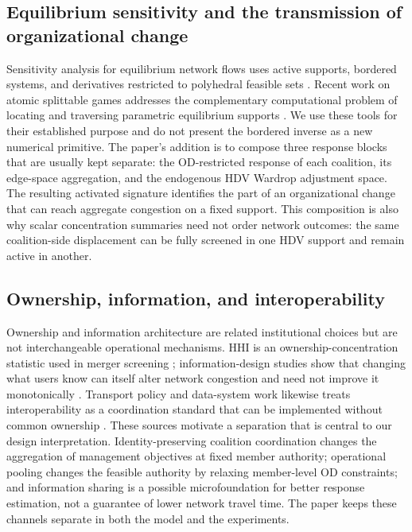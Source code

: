 \subsection{Equilibrium sensitivity and the transmission of organizational change}

Sensitivity analysis for equilibrium network flows uses active supports, bordered systems, and derivatives restricted to polyhedral feasible sets \citep{tobin1988,qiu1989,patriksson2004,josefsson2006}. Recent work on atomic splittable games addresses the complementary computational problem of locating and traversing parametric equilibrium supports \citep{klimm2025}. We use these tools for their established purpose and do not present the bordered inverse as a new numerical primitive. The paper's addition is to compose three response blocks that are usually kept separate: the OD-restricted response of each coalition, its edge-space aggregation, and the endogenous HDV Wardrop adjustment space. The resulting activated signature identifies the part of an organizational change that can reach aggregate congestion on a fixed support. This composition is also why scalar concentration summaries need not order network outcomes: the same coalition-side displacement can be fully screened in one HDV support and remain active in another.

\subsection{Ownership, information, and interoperability}

Ownership and information architecture are related institutional choices but are not interchangeable operational mechanisms. HHI is an ownership-concentration statistic used in merger screening \citep{usdojftc2023}; information-design studies show that changing what users know can itself alter network congestion and need not improve it monotonically \citep{acemoglu2018,massicot2022}. Transport policy and data-system work likewise treats interoperability as a coordination standard that can be implemented without common ownership \citep{marquez2025,ec2023mobilitydataspace}. These sources motivate a separation that is central to our design interpretation. Identity-preserving coalition coordination changes the aggregation of management objectives at fixed member authority; operational pooling changes the feasible authority by relaxing member-level OD constraints; and information sharing is a possible microfoundation for better response estimation, not a guarantee of lower network travel time. The paper keeps these channels separate in both the model and the experiments.

